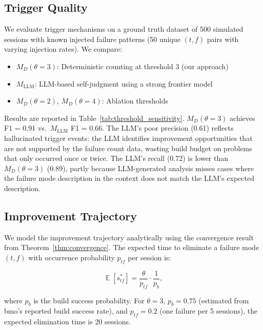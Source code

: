 \documentclass[11pt]{article}
\DeclareMathOperator{\E}{\mathbb{E}}
\begin{document}
\subsection{Trigger Quality}

We evaluate trigger mechanisms on a ground truth dataset of 500 simulated
sessions with known injected failure patterns (50 unique $(t,f)$ pairs with
varying injection rates). We compare:

\begin{itemize}[leftmargin=1.5em]
    \item $M_D(\theta=3)$: Deterministic counting at threshold 3 (our approach)
    \item $M_{\text{LLM}}$: LLM-based self-judgment using a strong frontier model
    \item $M_D(\theta=2)$, $M_D(\theta=4)$: Ablation thresholds
\end{itemize}

Results are reported in Table~\ref{tab:threshold_sensitivity}.
$M_D(\theta=3)$ achieves F1 = 0.91 vs.\ $M_{\text{LLM}}$ F1 = 0.66.
The LLM's poor precision (0.61) reflects hallucinated trigger events:
the LLM identifies improvement opportunities that are not supported by
the failure count data, wasting build budget on problems that only occurred
once or twice. The LLM's recall (0.72) is lower than $M_D(\theta=3)$ (0.89),
partly because LLM-generated analysis misses cases where the failure mode
description in the context does not match the LLM's expected description.

\subsection{Improvement Trajectory}

We model the improvement trajectory analytically using the convergence
result from Theorem~\ref{thm:convergence}. The expected time to eliminate
a failure mode $(t,f)$ with occurrence probability $p_{tf}$ per session is:

\begin{equation}
\E[s^*_{tf}] = \frac{\theta}{p_{tf}} \cdot \frac{1}{p_b},
\end{equation}

where $p_b$ is the build success probability. For $\theta=3$, $p_b=0.75$
(estimated from bmo's reported build success rate), and $p_{tf}=0.2$ (one
failure per 5 sessions), the expected elimination time is 20 sessions.
\end{document}
